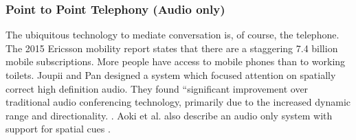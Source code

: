 \subsubsection{Point to Point Telephony (Audio only)}
The ubiquitous technology to mediate conversation is, of course, the telephone. The 2015 Ericsson mobility report \cite{2015} states that there are a staggering 7.4 billion mobile subscriptions. More people have access to mobile phones than to working toilets. %
Joupii and Pan designed a system which focused attention on spatially correct high definition audio. They found ``significant improvement over traditional audio conferencing technology, primarily due to the increased dynamic range and directionality. \cite{jouppi2002mutually}. Aoki et al. also describe an audio only system with support for spatial cues \cite{Aoki2003}.

